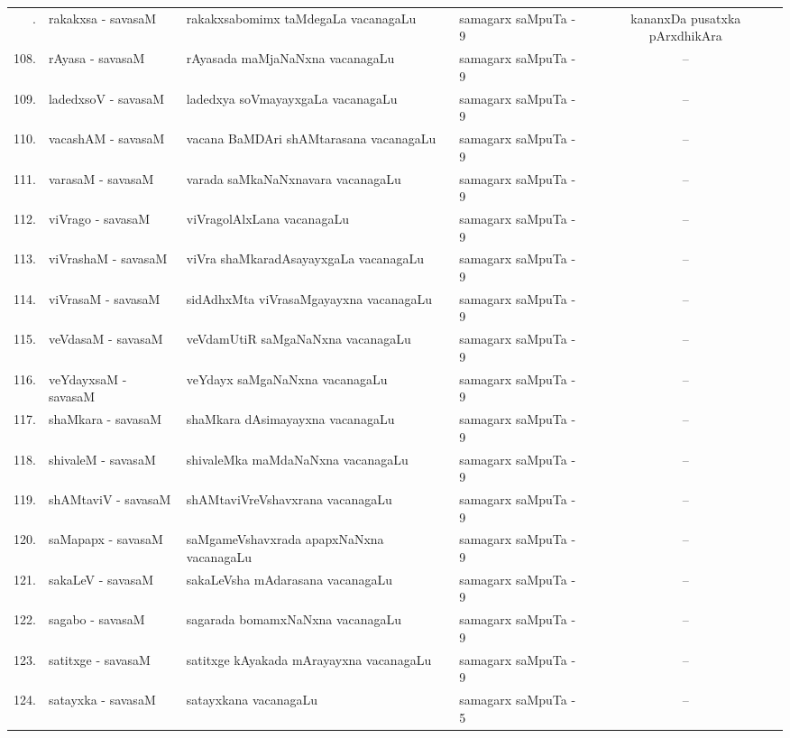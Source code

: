 {\renewcommand{\arraystretch}{1.3}
\begin{longtable}{rl>{\raggedright}p{5.5cm}lc}
\hline
\endfirsthead
\hline
\endhead
\hline
\endfoot
\endlastfoot
107. & rakakxsa - savasaM & rakakxsabomimx taMdegaLa vacanagaLu &  samagarx saMpuTa - 9 & kananxDa pusatxka pArxdhikAra\\
108. & rAyasa - savasaM &  rAyasada maMjaNaNxna vacanagaLu & samagarx saMpuTa - 9 & --\\
109. &  ladedxsoV - savasaM &  ladedxya soVmayayxgaLa vacanagaLu & samagarx saMpuTa - 9 & --\\
110. &  vacashAM - savasaM & vacana BaMDAri shAMtarasana vacanagaLu & samagarx saMpuTa - 9 & --\\
111. &  varasaM - savasaM &  varada saMkaNaNxnavara vacanagaLu & samagarx saMpuTa - 9 & --\\
112. &  viVrago - savasaM &  viVragolAlxLana vacanagaLu & samagarx saMpuTa - 9 & --\\
113. & viVrashaM - savasaM &  viVra shaMkaradAsayayxgaLa vacanagaLu & samagarx saMpuTa - 9 & --\\
114. & viVrasaM - savasaM & sidAdhxMta viVrasaMgayayxna vacanagaLu & samagarx saMpuTa - 9 & --\\
115. & veVdasaM - savasaM &  veVdamUtiR saMgaNaNxna vacanagaLu & samagarx saMpuTa - 9 & --\\
116. & veYdayxsaM - savasaM &  veYdayx saMgaNaNxna vacanagaLu & samagarx saMpuTa - 9 & --\\
117. & shaMkara - savasaM &  shaMkara dAsimayayxna vacanagaLu & samagarx saMpuTa - 9 & --\\
118. & shivaleM - savasaM &  shivaleMka maMdaNaNxna vacanagaLu & samagarx saMpuTa - 9 & --\\
119. & shAMtaviV - savasaM & shAMtaviVreVshavxrana vacanagaLu & samagarx saMpuTa - 9 & --\\
120. & saMapapx - savasaM &  saMgameVshavxrada apapxNaNxna vacanagaLu & samagarx saMpuTa - 9 & --\\
121. & sakaLeV - savasaM & sakaLeVsha mAdarasana vacanagaLu & samagarx saMpuTa - 9 & --\\
122. & sagabo - savasaM & sagarada bomamxNaNxna vacanagaLu & samagarx saMpuTa - 9 & --\\
123. & satitxge - savasaM & satitxge kAyakada mArayayxna vacanagaLu & samagarx saMpuTa - 9 & --\\
124. & satayxka - savasaM & satayxkana vacanagaLu & samagarx saMpuTa - 5 & --\\

\end{longtable}}
